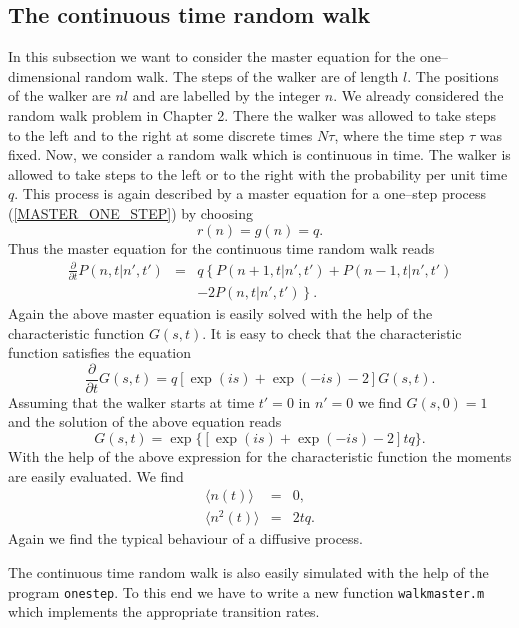 \subsection{The continuous time random walk}
In this subsection we want to consider the master equation for
the one--dimensional random walk. The steps of the walker are of 
length $l$. The positions of the walker are $nl$ and are labelled
by the integer $n$. We already considered the random walk problem 
in Chapter 2.  There the walker was allowed to take steps 
to the left and to the right at some 
discrete times $N\tau$, where the time step $\tau$ was fixed.
Now, we consider a random walk which is continuous in time. The 
walker is allowed to take steps to the left or to the right with 
the probability per unit time $q$. This process is again described 
by a master equation for a one--step process (\ref{MASTER_ONE_STEP})
by choosing
\begin{equation*}
r(n) =g(n) =q.
\end{equation*}
Thus the master equation for the continuous time random walk
reads
\begin{eqnarray}
\label{MASTERWALK}
\frac{\partial}{\partial t} P(n,t|n',t') &=& 
       q \left\{ P(n+1,t|n',t') + P(n-1,t|n',t')\right. \\
       && \left.  - 2 P(n,t|n',t')  \right\}. \nonumber
\end{eqnarray}
Again the above master equation is easily solved with the help of 
the characteristic function $G(s,t)$. It is easy to check that the
characteristic function satisfies the equation
\begin{equation*}
\frac{\partial}{\partial t} G(s,t) = q [\exp(is) +\exp(-is) -2] G(s,t).
\end{equation*}
Assuming that the walker starts at time $t'=0$ in $n'=0$ we find
$G(s,0)=1$ and the solution of the above equation reads
\begin{equation*}
G(s,t) = \exp\{[ \exp(is) +\exp(-is) -2  ]tq\}.
\end{equation*}
With the help of the above expression for the characteristic 
function the moments are easily evaluated. We find
\begin{eqnarray*}
\langle n(t) \rangle &=& 0, \\
\langle n^2(t) \rangle &=& 2tq.
\end{eqnarray*}
Again we find the typical behaviour of a diffusive process.

The continuous time random walk is also easily simulated with the
help of the program \texttt{onestep}. To this end we have to write
a new function \texttt{walkmaster.m} which implements the 
appropriate transition rates.

